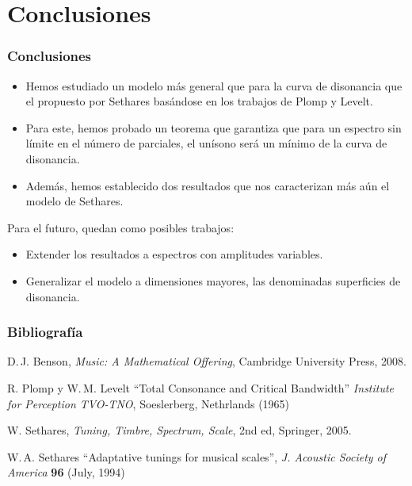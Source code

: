 \documentclass[12 pt]{beamer}
\begin{document}
\section{Conclusiones}
\begin{frame}{25}
    \frametitle{Conclusiones}
    
    \begin{itemize}
        \item Hemos estudiado un modelo más general que para la curva de disonancia que el propuesto por Sethares basándose en los trabajos de Plomp y Levelt.
        \item Para este, hemos probado un teorema que garantiza que para un espectro sin límite en el número de parciales, el unísono será un mínimo de la curva de disonancia.
        \item Además, hemos establecido dos resultados que nos caracterizan más aún el modelo de Sethares.
    \end{itemize}
    
    Para el futuro, quedan como posibles trabajos:
    \begin{itemize}
        \item Extender los resultados a espectros con amplitudes variables.
        \item Generalizar el modelo a dimensiones mayores, las denominadas superficies de disonancia.
    \end{itemize}
\end{frame}

\begin{frame}{26}
    \frametitle{Bibliografía}
    
    
    \begin{thebibliography}{ABC9999}

    D.\,J. Benson,
    \textit{Music: A Mathematical Offering}, 
        Cambridge University Press, 2008.
	    
    R. Plomp y W.\,M. Levelt
    ``Total Consonance and Critical Bandwidth''
        \textit{Institute for Perception TVO-TNO}, Soeslerberg, Nethrlands (1965)

    W. Sethares,
        \textit{Tuning, Timbre, Spectrum, Scale}, 2nd ed,
        Springer, 2005.

    W.\,A. Sethares
    ``Adaptative tunings for musical scales'',
        \textit{J. Acoustic Society of America} \textbf{96} (July, 1994)


\end{thebibliography}
        
\end{frame}
\end{document}
